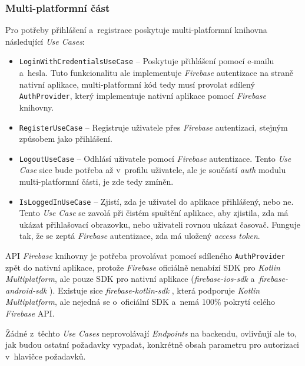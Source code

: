 \subsubsection{Multi-platformní část}

Pro potřeby přihlášení a~registrace poskytuje multi-platformní knihovna následující \emph{Use Cases}:
\begin{itemize}
\item\texttt{LoginWithCredentialsUseCase} – Poskytuje přihlášení pomocí e-mailu a~hesla. Tuto funkcionalitu ale implementuje \emph{Firebase} autentizace na straně nativní aplikace, multi-platformní kód tedy musí provolat sdílený \texttt{AuthProvider}, který implementuje nativní aplikace pomocí \emph{Firebase} knihovny.
\item\texttt{RegisterUseCase} – Registruje uživatele přes \emph{Firebase} autentizaci, stejným způsobem jako přihlášení.
\item\texttt{LogoutUseCase} – Odhlásí uživatele pomocí \emph{Firebase} autentizace. Tento \emph{Use Case} sice bude potřeba až v~profilu uživatele, ale je součástí \emph{auth} modulu multi-platformní části, je zde tedy zmíněn.
\item\texttt{IsLoggedInUseCase} – Zjistí, zda je uživatel do aplikace přihlášený, nebo ne. Tento \emph{Use Case} se zavolá při čistém spuštění aplikace, aby zjistila, zda má ukázat přihlašovací obrazovku, nebo uživateli rovnou ukázat časovač. Funguje tak, že se zeptá \emph{Firebase} autentizace, zda má uložený \emph{access token}.
\end{itemize}

API \emph{Firebase} knihovny je potřeba provolávat pomocí sdíleného \texttt{AuthProvider} zpět do nativní aplikace, protože \emph{Firebase} oficiálně nenabízí SDK pro \emph{Kotlin Multiplatform}, ale pouze SDK pro nativní aplikace (\emph{firebase-ios-sdk} \cite{firebase-ios-sdk} a~\emph{firebase-android-sdk} \cite{firebase-android-sdk}). Existuje sice \emph{firebase-kotlin-sdk} \cite{firebase-kotlin-sdk}, která podporuje \emph{Kotlin Multiplatform}, ale nejedná se o~oficiální SDK a~nemá 100\% pokrytí celého \emph{Firebase} API.

Žádné z~těchto \emph{Use Cases} neprovolávají \emph{Endpoints} na backendu, ovlivňují ale to, jak budou ostatní požadavky vypadat, konkrétně obsah parametru pro autorizaci v~hlavičce požadavků.

